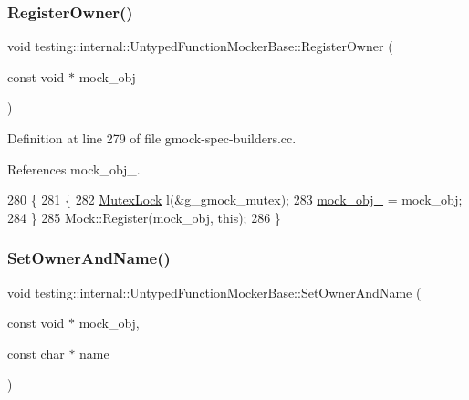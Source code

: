 \subsubsection{\texorpdfstring{Register\+Owner()}{RegisterOwner()}}
{\footnotesize\ttfamily void testing\+::internal\+::\+Untyped\+Function\+Mocker\+Base\+::\+Register\+Owner (\begin{DoxyParamCaption}\item[{const void $\ast$}]{mock\+\_\+obj }\end{DoxyParamCaption})}



Definition at line 279 of file gmock-\/spec-\/builders.\+cc.



References mock\+\_\+obj\+\_\+.


\begin{DoxyCode}
280                                         \{
281   \{
282     \hyperlink{namespacetesting_1_1internal_a08b187c6cc4e28400aadf9a32fccc8de}{MutexLock} l(&g\_gmock\_mutex);
283     \hyperlink{classtesting_1_1internal_1_1UntypedFunctionMockerBase_adf35c589969bb985668616031cb9ed56}{mock\_obj\_} = mock\_obj;
284   \}
285   Mock::Register(mock\_obj, \textcolor{keyword}{this});
286 \}
\end{DoxyCode}
\mbox{\label{classtesting_1_1internal_1_1UntypedFunctionMockerBase_a287bcacee639b7d123cec29e0614fe96}} 
\subsubsection{\texorpdfstring{Set\+Owner\+And\+Name()}{SetOwnerAndName()}}
{\footnotesize\ttfamily void testing\+::internal\+::\+Untyped\+Function\+Mocker\+Base\+::\+Set\+Owner\+And\+Name (\begin{DoxyParamCaption}\item[{const void $\ast$}]{mock\+\_\+obj,  }\item[{const char $\ast$}]{name }\end{DoxyParamCaption})}



